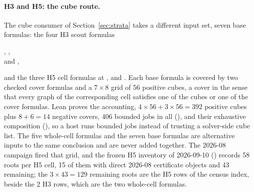 \documentclass{anvil-paper}
\newcommand{\repobase}{https://github.com/rjwalters/lean-genius/blob/erdos85/integration}
\newcommand{\repofile}[2]{\href{\repobase/#1}{\lean{#2}}}
\theoremstyle{definition}
\begin{document}
\paragraph{H3 and H5: the cube route.} The cube consumer of Section~\ref{sec:strata} takes a different input set, seven base formulas: the four H3 scout formulas
\begin{flushleft}\small
{}, ,\\
 and ,
\end{flushleft}
\noindent and the three H5 cell formulas  at ,  and . Each base formula is covered by two checked cover formulas and a $7\times 8$ grid of 56 positive cubes, a cover in the sense that every graph of the corresponding cell satisfies one of the cubes or one of the cover formulas. Lean proves the accounting, $4\times 56+3\times 56=392$ positive cubes plus $8+6=14$ negative covers, 406 bounded jobs in all (), and their exhaustive composition (), so a host runs bounded jobs instead of trusting a solver-side cube list. The five whole-cell formulas and the seven base formulas are alternative inputs to the same conclusion and are never added together. The 2026-08 campaign fired that grid, and the frozen H5 inventory of 2026-09-10 (\repofile{research/problems/erdos-85-wip-01/PHASE_B_H5_H7_INVENTORY_20260910.md}{PHASE_B_H5_H7_INVENTORY_20260910.md}) records 58 roots per H5 cell, 15 of them with direct 2026-08 certificate objects and 43 remaining; the $3\times 43=129$ remaining roots are the H5 rows of the census index, beside the 2 H3 rows, which are the two whole-cell formulas.
\end{document}
